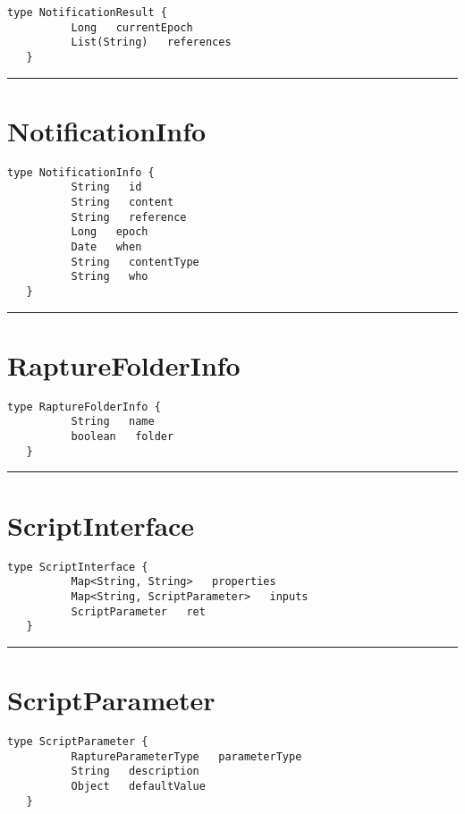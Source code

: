 \begin{lstlisting}[style=nonumbers]
   type NotificationResult {
          Long   currentEpoch
          List(String)   references
   }
\end{lstlisting}

\rule{12cm}{2pt}
\section{NotificationInfo}
\label{type:NotificationInfo}

\begin{lstlisting}[style=nonumbers]
   type NotificationInfo {
          String   id
          String   content
          String   reference
          Long   epoch
          Date   when
          String   contentType
          String   who
   }
\end{lstlisting}

\rule{12cm}{2pt}
\section{RaptureFolderInfo}
\label{type:RaptureFolderInfo}

\begin{lstlisting}[style=nonumbers]
   type RaptureFolderInfo {
          String   name
          boolean   folder
   }
\end{lstlisting}

\rule{12cm}{2pt}
\section{ScriptInterface}
\label{type:ScriptInterface}

\begin{lstlisting}[style=nonumbers]
   type ScriptInterface {
          Map<String, String>   properties
          Map<String, ScriptParameter>   inputs
          ScriptParameter   ret
   }
\end{lstlisting}

\rule{12cm}{2pt}
\section{ScriptParameter}
\label{type:ScriptParameter}

\begin{lstlisting}[style=nonumbers]
   type ScriptParameter {
          RaptureParameterType   parameterType
          String   description
          Object   defaultValue
   }
\end{lstlisting}

